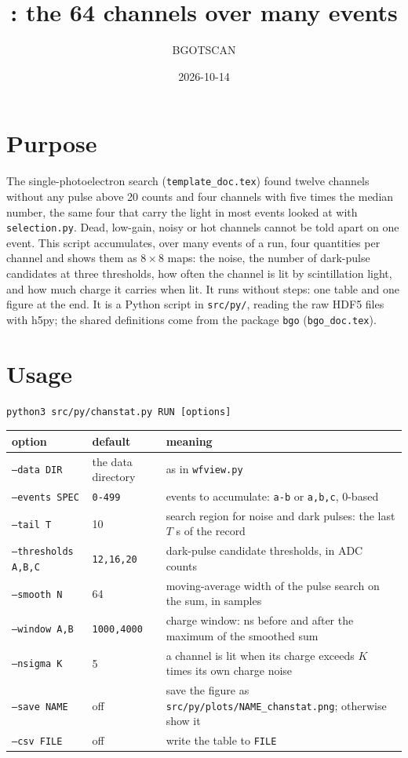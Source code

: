 \documentclass[11pt]{article}
\title{\code{chanstat.py}: the 64 channels over many events}
\author{BGOTSCAN}
\date{2026-10-14}
\newcommand{\code}[1]{\texttt{#1}}
\newcommand{\us}{\textmu s}
\begin{document}
\maketitle

\section{Purpose}

The single-photoelectron search (\code{template\_doc.tex}) found twelve
channels without any pulse above 20 counts and four channels with five
times the median number, the same four that carry the light in most
events looked at with \code{selection.py}. Dead, low-gain, noisy or hot
channels cannot be told apart on one event. This script accumulates, over
many events of a run, four quantities per channel and shows them as
$8\times8$ maps: the noise, the number of dark-pulse candidates at three
thresholds, how often the channel is lit by scintillation light, and how
much charge it carries when lit. It runs without steps: one table and one
figure at the end. It is a Python script in \code{src/py/}, reading the
raw HDF5 files with h5py; the shared definitions come from the package
\code{bgo} (\code{bgo\_doc.tex}).

\section{Usage}

\begin{lstlisting}
python3 src/py/chanstat.py RUN [options]
\end{lstlisting}

\begin{center}
\begin{tabular}{l l p{76mm}}
\toprule
option & default & meaning \\
\midrule
\code{--data DIR} & the data directory & as in \code{wfview.py} \\
\code{--events SPEC} & \code{0-499} & events to accumulate: \code{a-b} or \code{a,b,c}, 0-based \\
\code{--tail T} & 10 & search region for noise and dark pulses: the last $T$ \us{} of the record \\
\code{--thresholds A,B,C} & \code{12,16,20} & dark-pulse candidate thresholds, in ADC counts \\
\code{--smooth N} & 64 & moving-average width of the pulse search on the sum, in samples \\
\code{--window A,B} & \code{1000,4000} & charge window: ns before and after the maximum of the smoothed sum \\
\code{--nsigma K} & 5 & a channel is lit when its charge exceeds $K$ times its own charge noise \\
\code{--save NAME} & off & save the figure as \code{src/py/plots/NAME\_chanstat.png}; otherwise show it \\
\code{--csv FILE} & off & write the table to \code{FILE} \\
\bottomrule
\end{tabular}
\end{center}
\end{document}
